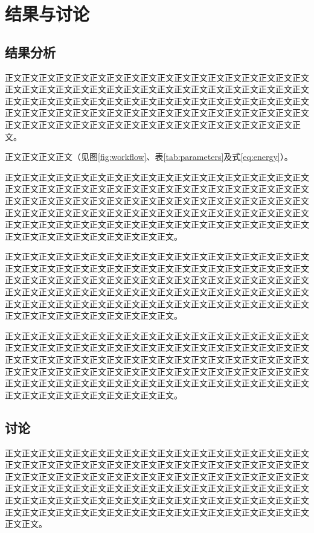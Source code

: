 \chapter{结果与讨论}\label{chap:results}
\section{结果分析}
正文正文正文正文正文正文正文正文正文正文正文正文正文正文正文正文正文正文正文正文正文正文正文正文正文正文正文正文正文正文正文正文正文正文正文正文正文正文正文正文正文正文正文正文正文正文正文正文正文正文正文正文正文正文正文正文正文正文正文正文正文正文正文正文正文正文正文正文正文正文正文正文正文正文正文正文正文正文正文正文正文正文正文正文正文正文正文正文正文正文。

正文正文正文正文（见图\ref{fig:workflow}、表\ref{tab:parameters}及式\eqref{eq:energy}）。

正文正文正文正文正文正文正文正文正文正文正文正文正文正文正文正文正文正文正文正文正文正文正文正文正文正文正文正文正文正文正文正文正文正文正文正文正文正文正文正文正文正文正文正文正文正文正文正文正文正文正文正文正文正文正文正文正文正文正文正文正文正文正文正文正文正文正文正文正文正文正文正文正文正文正文正文正文正文正文正文正文正文正文正文正文正文正文正文正文正文正文正文正文正文正文正文正文正文正文正文。

正文正文正文正文正文正文正文正文正文正文正文正文正文正文正文正文正文正文正文正文正文正文正文正文正文正文正文正文正文正文正文正文正文正文正文正文正文正文正文正文正文正文正文正文正文正文正文正文正文正文正文正文正文正文正文正文正文正文正文正文正文正文正文正文正文正文正文正文正文正文正文正文正文正文正文正文正文正文正文正文正文正文正文正文正文正文正文正文正文正文正文正文正文正文正文正文正文正文正文正文。

正文正文正文正文正文正文正文正文正文正文正文正文正文正文正文正文正文正文正文正文正文正文正文正文正文正文正文正文正文正文正文正文正文正文正文正文正文正文正文正文正文正文正文正文正文正文正文正文正文正文正文正文正文正文正文正文正文正文正文正文正文正文正文正文正文正文正文正文正文正文正文正文正文正文正文正文正文正文正文正文正文正文正文正文正文正文正文正文正文正文正文正文正文正文正文正文正文正文正文正文。

\section{讨论}
正文正文正文正文正文正文正文正文正文正文正文正文正文正文正文正文正文正文正文正文正文正文正文正文正文正文正文正文正文正文正文正文正文正文正文正文正文正文正文正文正文正文正文正文正文正文正文正文正文正文正文正文正文正文正文正文正文正文正文正文正文正文正文正文正文正文正文正文正文正文正文正文正文正文正文正文正文正文正文正文正文正文正文正文正文正文正文正文正文正文正文正文正文正文正文正文正文正文正文正文正文正文正文正文正文正文正文正文正文正文。

